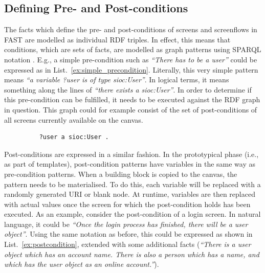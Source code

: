 \documentclass[twoside]{fast_latex}
\begin{document}

\subsection{Defining Pre- and Post-conditions} %
\label{sub:defining_pre_and_post_conditions}

The facts which define the pre- and post-conditions of screens and screenflows in FAST are modelled as individual RDF triples. In effect, this means that conditions, which are sets of facts, are modelled as graph patterns using SPARQL notation \cite{sparql2008spec}. E.g., a simple pre-condition such as \emph{``There has to be a user''} could be expressed as in List.~\ref{ex:simple_precondition}. Literally, this very simple pattern means \emph{``a variable ?user is of type sioc:User''}. In logical terms, it means something along the lines of \emph{``there exists a sioc:User''}. In order to determine if this  pre-condition can be fulfilled, it needs to be executed against the RDF graph in question. This graph could for example consist of the set of post-conditions of all screens currently available on the canvas.

\singlespacing
{}
\begin{figure}
\begin{lstlisting}
	?user a sioc:User .
\end{lstlisting}
\end{figure}
\doublespacing

Post-conditions are expressed in a similar fashion. In the prototypical phase (i.e., as part of templates), post-condition patterns have variables in the same way as pre-condition patterns. When a building block is copied to the canvas, the pattern needs to be materialised. To do this, each variable will be replaced with a randomly generated URI or blank node. At runtime, variables are then replaced with actual values once the screen for which the post-condition holds has been executed. As an example, consider the post-condition of a login screen. In natural language, it could be \emph{``Once the login process has finished, there will be a user object''}. Using the same notation as before, this could be expressed as shown in List.~\ref{ex:postcondition}, extended with some additional facts (\emph{``There is a user object which has an account name. There is also a person which has a name, and which has the user object as an online account.''}).
\end{document}
